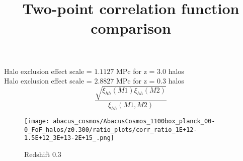 \documentclass[12pt]{article}
\title{Two-point correlation function comparison}
\begin{document}
	\maketitle

Halo exclusion effect scale = $1.1127$ MPc for z = 3.0 halos\\
Halo exclusion effect scale = $2.8827$ MPc for z = 0.3 halos\\

\begin{equation}
	\label{ratio}
	 \frac{\sqrt{\xi_{hh}(M1)\xi_{hh}(M2)}}{\xi_{hh}(M1,M2)}
\end{equation}

\begin{figure}[h]
	\centering
	\texttt{[image: abacus\_cosmos/AbacusCosmos\_1100box\_planck\_00-0\_FoF\_halos/z0.300/ratio\_plots/corr\_ratio\_1E+12-1.5E+12\_3E+13-2E+15\_.png]}
	\caption{Redshift 0.3}
	\label{fig:ratio}
\end{figure}
\end{document}
